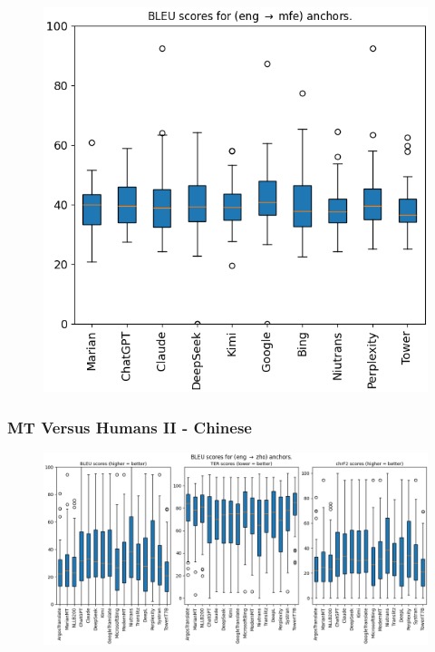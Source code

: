 \documentclass[aspectratio=169]{beamer}
\begin{document}
\begin{frame}[fragile]
\begin{minipage}{.33\textwidth}
\begin{figure}
    \end{figure}
    \end{minipage}%
        \begin{minipage}{.33\textwidth}
    \begin{figure}
        \centering
        \includegraphics[width=1.0\textwidth]{images/eval-01-Morisien-Anchors-bleu.png} 
    \end{figure}
    \end{minipage}
\end{frame}

\begin{frame}[fragile]
	\frametitle{MT Versus Humans II - Chinese}
    \begin{minipage}{1.0\textwidth}
    \begin{figure}
        \centering
        \includegraphics[width=1.0\textwidth]{images/eval-01-Chinese-Anchors.png} 
    \end{figure}
    \end{minipage}
\end{frame}
\end{document}
